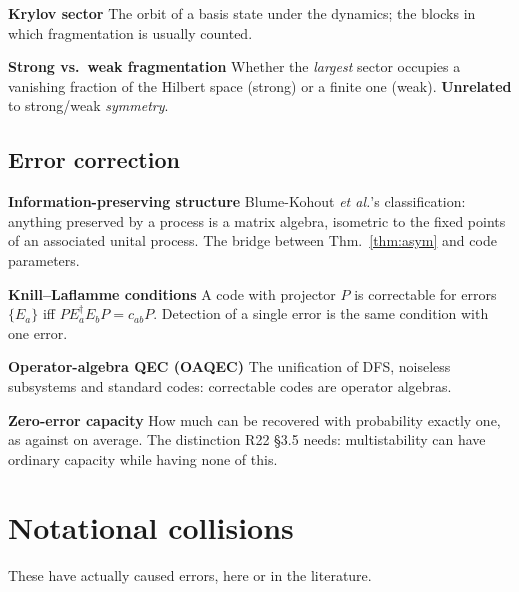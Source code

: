 \documentclass[11pt]{article}
\newcommand{\term}[1]{\medskip\noindent\textbf{#1}\quad}
\theoremstyle{plain}
\theoremstyle{remark}
\begin{document}
\term{Krylov sector} The orbit of a basis state under the dynamics; the blocks
in which fragmentation is usually counted. \cite{Sala2020, MBR2022}

\term{Strong vs.\ weak fragmentation} Whether the \emph{largest} sector occupies
a vanishing fraction of the Hilbert space (strong) or a finite one (weak).
\textbf{Unrelated} to strong/weak \emph{symmetry}. \cite{Sala2020, MBR2022}

\subsection{Error correction}

\term{Information-preserving structure} Blume-Kohout \emph{et al.}'s
classification: anything preserved by a process is a matrix algebra, isometric
to the fixed points of an associated unital process. The bridge between
Thm.~\ref{thm:asym} and code parameters. \cite{BKNPV2008}

\term{Knill--Laflamme conditions} A code with projector $P$ is correctable for
errors $\{E_a\}$ iff $P E_a^\dagger E_b P = c_{ab} P$. Detection of a single
error is the same condition with one error. \cite{KL1997, NC2010}

\term{Operator-algebra QEC (OAQEC)} The unification of DFS, noiseless subsystems
and standard codes: correctable codes are operator algebras. \cite{KLP2005}

\term{Zero-error capacity} How much can be recovered with probability exactly
one, as against on average. The distinction R22 \S3.5 needs: multistability can
have ordinary capacity while having none of this. \cite{BKNPV2008}

\section{Notational collisions}
\label{sec:collisions}

These have actually caused errors, here or in the literature.
\end{document}
